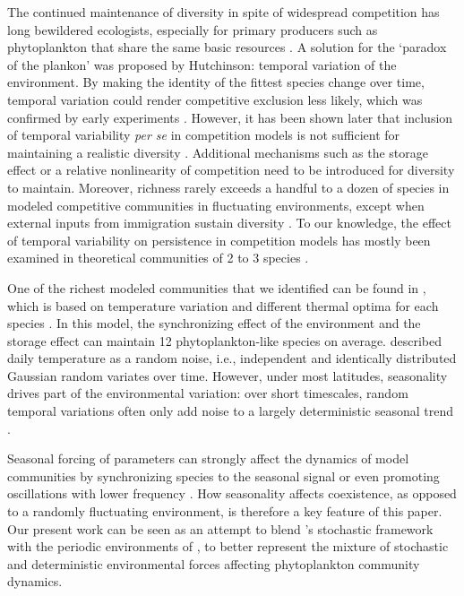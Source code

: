 \documentclass[a4paper,12pt]{article}
\begin{document}
The continued maintenance of diversity in spite of widespread competition
has long bewildered ecologists, especially for primary producers such
as phytoplankton that share the same basic resources \citep{hutchinson_paradox_1961}.
A solution for the `paradox of the plankon' was proposed by Hutchinson:
temporal variation of the environment. By making the identity of the
fittest species change over time, temporal variation could render
competitive exclusion less likely, which was confirmed by early experiments
\citep{sommer_paradox_1984}. However, it has been shown later that
inclusion of temporal variability \emph{per se} in competition models
is not sufficient for maintaining a realistic diversity \citep{chesson_roles_1997,fox_intermediate_2013}.
Additional mechanisms such as the storage effect \citep{chesson_multispecies_1994,ellner_how_2016}
or a relative nonlinearity of competition \citep{armstrong_r.a._competitive_1980,chesson_mechanisms_2000,descamps-julien_stable_2005,jiang_temperature_2007,fox_intermediate_2013}
need to be introduced for diversity to maintain. Moreover, richness
rarely exceeds a handful to a dozen of species in modeled competitive
communities in fluctuating environments, except when external inputs
from immigration sustain diversity \citep[e.g., ][]{huisman_towards_2001,jabot_non-random_2016}.
To our knowledge, the effect of temporal variability on persistence
in competition models has mostly been examined in theoretical communities
of 2 to 3 species \citep[e.g.,][]{chesson_roles_1997,litchman_competition_2001,li_effects_2016,miller_evolutionary_2017}.

One of the richest modeled communities that we identified can be found
in \citet{scranton_coexistence_2016}, which is based on temperature
variation and different thermal optima for each species \citep{moisan_modelling_2002}.
In this model, the synchronizing effect of the environment and the
storage effect can maintain 12 phytoplankton-like species on average.
\citet{scranton_coexistence_2016} described daily temperature as
a random noise, i.e., independent and identically distributed Gaussian
random variates over time. However, under most latitudes, seasonality
drives part of the environmental variation: over short timescales,
random temporal variations often only add noise to a largely deterministic
seasonal trend \citep{scheffer_seasonal_1997,boyce_environmental_2017,barraquand2018coastal}.

Seasonal forcing of parameters can strongly affect the dynamics of
model communities by synchronizing species to the seasonal signal
or even promoting oscillations with lower frequency \citep{rinaldi_multiple_1993,barabas_community_2012,miller_evolutionary_2017,vesipa_impact_2017}.
How seasonality affects coexistence, as opposed to a randomly fluctuating
environment, is therefore a key feature of this paper. Our present
work can be seen as an attempt to blend \citet{scranton_coexistence_2016}'s
stochastic framework with the periodic environments of \citet{barabas_community_2012},
to better represent the mixture of stochastic and deterministic environmental
forces affecting phytoplankton community dynamics.
\end{document}
